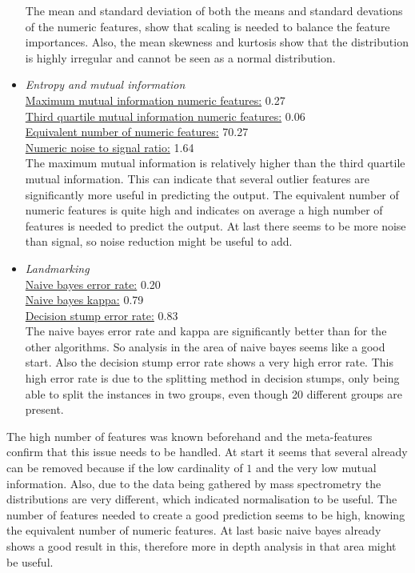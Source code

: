 \documentclass[10pt,a4paper]{report}
\begin{document}
\begin{itemize}
		The mean and standard deviation of both the means and standard devations of the numeric features, show that scaling is needed to balance the feature importances. Also, the mean skewness and kurtosis show that the distribution is highly irregular and cannot be seen as a normal distribution.
		
		\item \textit{Entropy and mutual information} \\
		\underline{Maximum mutual information numeric features:} 0.27 \\
		\underline{Third quartile mutual information numeric features:} 0.06 \\
		\underline{Equivalent number of numeric features:} 70.27 \\
		\underline{Numeric noise to signal ratio:} 1.64 \\
		
		The maximum mutual information is relatively higher than the third quartile mutual information. This can indicate that several outlier features are significantly more useful in predicting the output. The equivalent number of numeric features is quite high and indicates on average a high number of features is needed to predict the output. At last there seems to be more noise than signal, so noise reduction might be useful to add.
		
		\item \textit{Landmarking} \\
		\underline{Naive bayes error rate:} 0.20 \\
		\underline{Naive bayes kappa:} 0.79 \\
		\underline{Decision stump error rate:} 0.83 \\		
		
		The naive bayes error rate and kappa are significantly better than for the other algorithms. So analysis in the area of naive bayes seems like a good start. Also the decision stump error rate shows a very high error rate. This high error rate is due to the splitting method in decision stumps, only being able to split the instances in two groups, even though 20 different groups are present.
	\end{itemize}
	
	The high number of features was known beforehand and the meta-features confirm that this issue needs to be handled. At start it seems that several already can be removed because if the low cardinality of $1$ and the very low mutual information. Also, due to the data being gathered by mass spectrometry the distributions are very different, which indicated normalisation to be useful. The number of features needed to create a good prediction seems to be high, knowing the equivalent number of numeric features. At last basic naive bayes already shows a good result in this, therefore more in depth analysis in that area might be useful.
	
\end{document}
